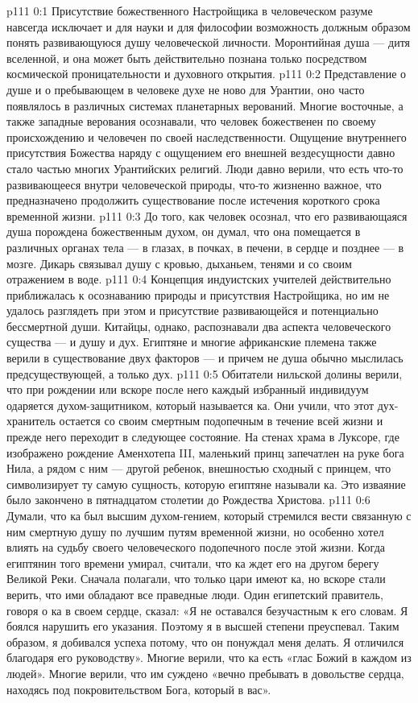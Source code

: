 \author{Одиночный Вестник}
\vs p111 0:1 Присутствие божественного Настройщика в человеческом разуме навсегда исключает и для науки и для философии возможность должным образом понять развивающуюся душу человеческой личности. Моронтийная душа --- дитя вселенной, и она может быть действительно познана только посредством космической проницательности и духовного открытия.
\vs p111 0:2 \pc Представление о душе и о пребывающем в человеке духе не ново для Урантии, оно часто появлялось в различных системах планетарных верований. Многие восточные, а также западные верования осознавали, что человек божественен по своему происхождению и человечен по своей наследственности. Ощущение внутреннего присутствия Божества наряду с ощущением его внешней вездесущности давно стало частью многих Урантийских религий. Люди давно верили, что есть что\hyp{}то развивающееся внутри человеческой природы, что\hyp{}то жизненно важное, что предназначено продолжить существование после истечения короткого срока временной жизни.
\vs p111 0:3 До того, как человек осознал, что его развивающаяся душа порождена божественным духом, он думал, что она помещается в различных органах тела --- в глазах, в почках, в печени, в сердце и позднее --- в мозге. Дикарь связывал душу с кровью, дыханьем, тенями и со своим отражением в воде.
\vs p111 0:4 Концепция  индуистских учителей действительно приближалась к осознаванию природы и присутствия Настройщика, но им не удалось разглядеть при этом и присутствие развивающейся и потенциально бессмертной души. Китайцы, однако, распознавали два аспекта человеческого существа ---  и  душу и дух. Египтяне и многие африканские племена также верили в существование двух факторов ---  и  причем не душа обычно мыслилась предсуществующей, а только дух.
\vs p111 0:5 Обитатели нильской долины верили, что при рождении или вскоре после него каждый избранный индивидуум одаряется духом\hyp{}защитником, который называется ка. Они учили, что этот дух\hyp{}хранитель остается со своим смертным подопечным в течение всей жизни и прежде него переходит в следующее состояние. На стенах храма в Луксоре, где изображено рождение Аменхотепа III, маленький принц запечатлен на руке бога Нила, а рядом с ним --- другой ребенок, внешностью сходный с принцем, что символизирует ту самую сущность, которую египтяне называли ка. Это изваяние было закончено в пятнадцатом столетии до Рождества Христова.
\vs p111 0:6 Думали, что ка был высшим духом\hyp{}гением, который стремился вести связанную с ним смертную душу по лучшим путям временной жизни, но особенно хотел влиять на судьбу своего человеческого подопечного после этой жизни. Когда египтянин того времени умирал, считали, что ка ждет его на другом берегу Великой Реки. Сначала полагали, что только цари имеют ка, но вскоре стали верить, что ими обладают все праведные люди. Один египетский правитель, говоря о ка в своем сердце, сказал: «Я не оставался безучастным к его словам. Я боялся нарушить его указания. Поэтому я в высшей степени преуспевал. Таким образом, я добивался успеха потому, что он понуждал меня делать. Я отличился благодаря его руководству». Многие верили, что ка есть «глас Божий в каждом из людей». Многие верили, что им суждено «вечно пребывать в довольстве сердца, находясь под покровительством Бога, который в вас».
